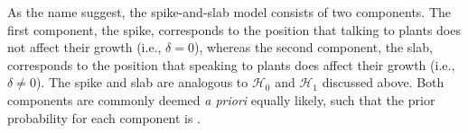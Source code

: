\documentclass[a4paper]{article}
\newcommand{\hypo}[1]{\ensuremath{\mathcal{H}_{#1}}}
\newenvironment{revision}{\color{teal}}{\color{black}}
\begin{document}
\begin{revision}As the name suggest, the spike-and-slab model consists of two components. The first component, the spike, \end{revision}corresponds to the position that talking to plants does not affect their growth (i.e., $\delta = 0$), whereas the second component\begin{revision}, the slab, \end{revision}corresponds to the position that speaking to plants does affect their growth (i.e., $\delta \neq 0$).
\begin{revision}%
\begin{revision}The spike and slab\end{revision} are analogous to \hypo{0} and \hypo{1} discussed above.
\end{revision}%
Both components are commonly deemed \emph{a priori} equally likely, such that the prior probability for each component is .
\end{document}
